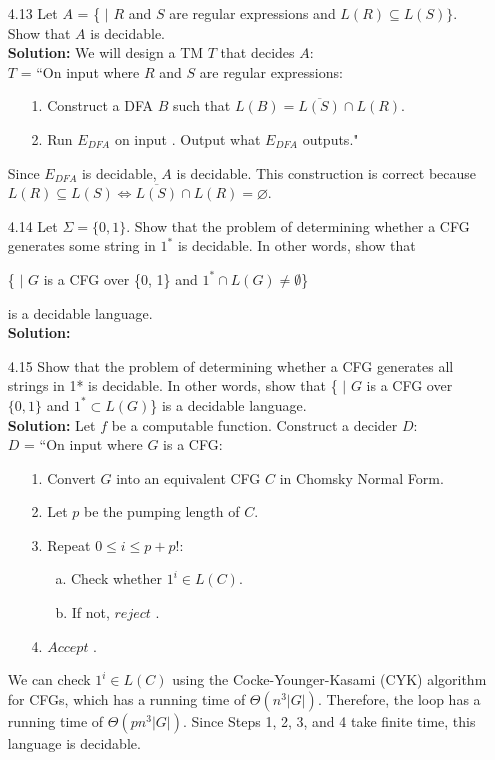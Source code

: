 \begin{enumerate}
\item[4.13]Let $A$ = \{ $|$ $R$ and $S$ are regular expressions and $L(R) \subseteq L(S)\}$. Show that $A$ is decidable.
\\
\textbf{Solution:} We will design a TM $T$ that decides $A$:
\\
$T$ = ``On input  where $R$ and $S$ are regular expressions:
\begin{enumerate}
\itemsep0em
\item[1.]Construct a DFA $B$ such that $L(B) = \overline{L(S)} \cap L(R)$.
\item[2.]Run $E_{DFA}$ on input . Output what $E_{DFA}$ outputs."
\end{enumerate}
Since $E_{DFA}$ is decidable, $A$ is decidable. This construction is correct because $L(R) \subseteq L(S) \Leftrightarrow \overline{L(S)} \cap L(R) = \varnothing$.

\item[4.14]Let $\Sigma = \{0, 1\}$. Show that the problem of determining whether a CFG generates some string in $1^*$ is decidable. In other words, show that
\begin{center}
\{ $|$ $G$ is a CFG over \{0, 1\} and $1^* \cap L(G) \ne \emptyset$\} 
\end{center}
is a decidable language.
\\
\textbf{Solution:} \alreadyanswered

\item[4.15]Show that the problem of determining whether a CFG generates all strings in 1* is decidable. In other words, show that \{ $|$ $G$ is a CFG over $\{0, 1\}$ and $1^* \subset L(G)$\} is a decidable language. 
\\
\textbf{Solution:} Let $f$ be a computable function. Construct a decider $D$:
\\
$D$ = ``On input  where $G$ is a CFG:
\begin{enumerate}
\itemsep0em
\item[1.]Convert $G$ into an equivalent CFG $C$ in Chomsky Normal Form.
\item[2.]Let $p$ be the pumping length of $C$.
\item[3.]Repeat $0 \le i \le p + p!$:
\begin{enumerate}
\item[a.]Check whether $1^i \in L(C)$.
\item[b.]If not, $reject$ .
\end{enumerate}
\item[4.]$Accept$ .
\end{enumerate}
We can check $1^i \in L(C)$ using the Cocke-Younger-Kasami (CYK) algorithm for CFGs, which has a running time of $\Theta(n^3 |G|)$. Therefore, the loop has a running time of $\Theta(pn^3 |G|)$. Since Steps 1, 2, 3, and 4 take finite time, this language is decidable.


\end{enumerate}
